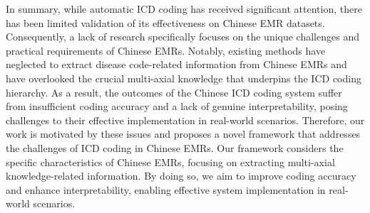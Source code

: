 In summary, while automatic ICD coding has received significant attention, there has been limited validation of its effectiveness on Chinese EMR datasets. Consequently, a lack of research specifically focuses on the unique challenges and practical requirements of Chinese EMRs. Notably, existing methods have neglected to extract disease code-related information from Chinese EMRs and have overlooked the crucial multi-axial knowledge that underpins the ICD coding hierarchy. As a result, the outcomes of the Chinese ICD coding system suffer from insufficient coding accuracy and a lack of genuine interpretability, posing challenges to their effective implementation in real-world scenarios. Therefore, our work is motivated by these issues and proposes a novel framework that addresses the challenges of ICD coding in Chinese EMRs. Our framework considers the specific characteristics of Chinese EMRs, focusing on extracting multi-axial knowledge-related information. By doing so, we aim to improve coding accuracy and enhance interpretability, enabling effective system implementation in real-world scenarios.